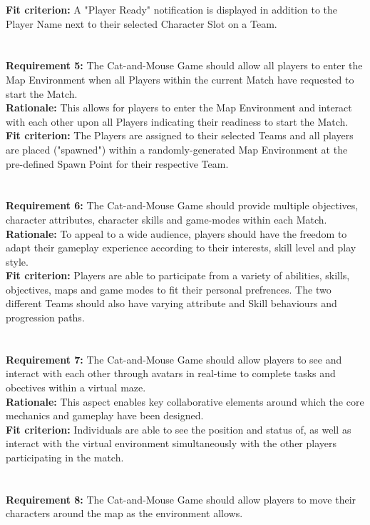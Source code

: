 \documentclass[12pt, titlepage]{article}
\begin{document}
\textbf{Fit criterion:}  A "Player Ready" notification is displayed in addition to the Player Name next to their selected Character Slot on a Team.
\\
\\
\\ \textbf{Requirement 5:}  The Cat-and-Mouse Game should allow all players to enter the Map Environment when all Players within the current Match have requested to start the Match.\\
\textbf{Rationale:}  This allows for players to enter the Map Environment and interact with each other upon all Players indicating their readiness to start the Match. \\
\textbf{Fit criterion:} The Players are assigned to their selected Teams and all players are placed ("spawned") within a randomly-generated Map Environment at the pre-defined Spawn Point for their respective Team.
\\
\\
\\ \textbf{Requirement 6:}  The Cat-and-Mouse Game should provide multiple objectives, character attributes, character skills and game-modes within each Match.\\
\textbf{Rationale:}  To appeal to a wide audience, players should have the freedom to adapt their gameplay experience according to their interests, skill level and play style.\\
\textbf{Fit criterion:}  Players are able to participate from a variety of abilities, skills, objectives, maps and game modes to fit their personal prefrences. The two different Teams should also have varying attribute and Skill behaviours and progression paths. 
\\
\\
\\ \textbf{Requirement 7:}  The Cat-and-Mouse Game should allow players to see and interact with each other through avatars in real-time to complete tasks and obectives within a virtual maze. \\
\textbf{Rationale:}  This aspect enables key collaborative elements around which the core mechanics and gameplay have been designed.\\
\textbf{Fit criterion:}  Individuals are able to see the position and status of, as well as interact with the virtual environment simultaneously with the other players participating in the match.
\\
\\
\\ \textbf{Requirement 8:}  The Cat-and-Mouse Game should allow players to move their characters around the map as the environment allows. \\
\end{document}
